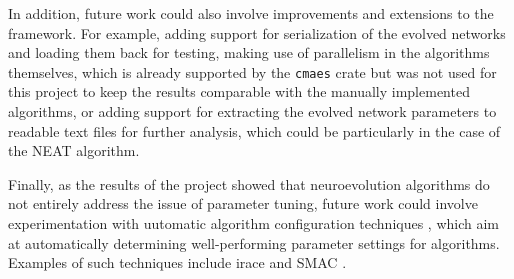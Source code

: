 In addition, future work could also involve improvements and extensions to the framework. For example, adding support for serialization of the evolved networks and loading them back for testing, making
use of parallelism in the algorithms themselves, which is already supported by the \texttt{cmaes} crate but was not used for this project to keep the results comparable with the manually implemented
algorithms, or adding support for extracting the evolved network parameters to readable text files for further analysis, which could be particularly in the case of the NEAT algorithm.

Finally, as the results of the project showed that neuroevolution algorithms do not entirely address the issue of parameter tuning, future work could involve experimentation with
uutomatic algorithm configuration techniques \cite{automl}, which aim at automatically determining well-performing parameter settings for algorithms. Examples of such techniques include
irace \cite{irace} and SMAC \cite{smac}.
